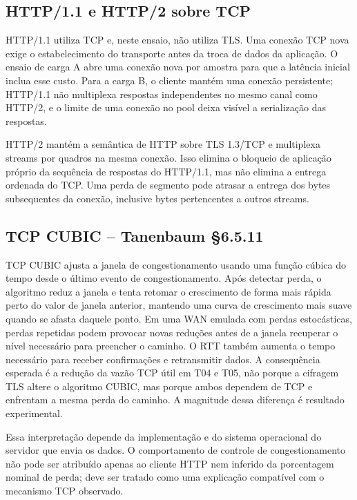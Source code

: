 \documentclass[12pt,a4paper]{article}
\begin{document}
\subsection{HTTP/1.1 e HTTP/2 sobre TCP}

HTTP/1.1 utiliza TCP e, neste ensaio, não utiliza TLS. Uma conexão TCP nova exige o
estabelecimento do transporte antes da troca de dados da aplicação. O ensaio de carga A
abre uma conexão nova por amostra para que a latência inicial inclua esse custo. Para a
carga B, o cliente mantém uma conexão persistente; HTTP/1.1 não multiplexa respostas
independentes no mesmo canal como HTTP/2, e o limite de uma conexão no pool deixa visível
a serialização das respostas.

HTTP/2 mantém a semântica de HTTP sobre TLS 1.3/TCP e multiplexa streams por quadros na
mesma conexão. Isso elimina o bloqueio de aplicação próprio da sequência de respostas do
HTTP/1.1, mas não elimina a entrega ordenada do TCP. Uma perda de segmento pode atrasar
a entrega dos bytes subsequentes da conexão, inclusive bytes pertencentes a outros streams.

\subsection{TCP CUBIC -- Tanenbaum \S 6.5.11}

TCP CUBIC ajusta a janela de congestionamento usando uma função cúbica do tempo desde o
último evento de congestionamento. Após detectar perda, o algoritmo reduz a janela e tenta
retomar o crescimento de forma mais rápida perto do valor de janela anterior, mantendo uma
curva de crescimento mais suave quando se afasta daquele ponto. Em uma WAN emulada com
perdas estocásticas, perdas repetidas podem provocar novas reduções antes de a janela
recuperar o nível necessário para preencher o caminho. O RTT também aumenta o tempo
necessário para receber confirmações e retransmitir dados. A consequência esperada é a
redução da vazão TCP útil em T04 e T05, não porque a cifragem TLS altere o algoritmo CUBIC,
mas porque ambos dependem de TCP e enfrentam a mesma perda do caminho. A magnitude dessa
diferença é resultado experimental.

Essa interpretação depende da implementação e do sistema operacional do servidor que envia
os dados. O comportamento de controle de congestionamento não pode ser atribuído apenas ao
cliente HTTP nem inferido da porcentagem nominal de perda; deve ser tratado como uma
explicação compatível com o mecanismo TCP observado.
\end{document}
